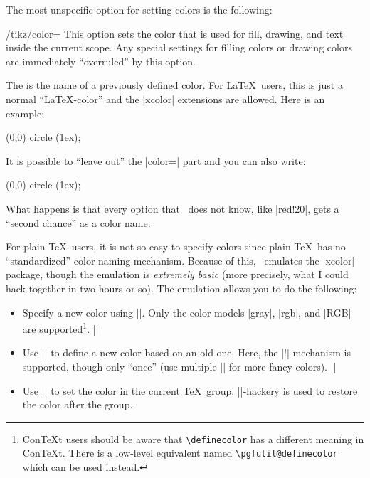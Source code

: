 The most unspecific option for setting colors is the following:
%
\begin{key}{/tikz/color=}
    This option sets the color that is used for fill, drawing, and text inside
    the current scope. Any special settings for filling colors or drawing
    colors are immediately ``overruled'' by this option.

    The  is the name of a previously defined color. For
    \LaTeX\ users, this is just a normal ``\LaTeX-color'' and the |xcolor|
    extensions are allowed. Here is an example:
\begin{codeexample}[]
\tikz \fill[color=red!20] (0,0) circle (1ex);
\end{codeexample}

    It is possible to ``leave out'' the |color=| part and you can also write:
\begin{codeexample}[]
\tikz \fill[red!20] (0,0) circle (1ex);
\end{codeexample}
    What happens is that every option that \tikzname\ does not know, like
    |red!20|, gets a ``second chance'' as a color name.

    For plain \TeX\ users, it is not so easy to specify colors since plain
    \TeX\ has no ``standardized'' color naming mechanism. Because of this,
    \pgfname\ emulates the |xcolor| package, though the emulation is
    \emph{extremely basic} (more precisely, what I could hack together in two
    hours or so). The emulation allows you to do the following:
    \begin{itemize}
        \item Specify a new color using |\definecolor|. Only the color models
            |gray|, |rgb|, and |RGB| are supported\footnote{Con\TeX t users
            should be aware that \texttt{\textbackslash definecolor} has a
            different meaning in Con\TeX t. There is a low-level equivalent
            named \texttt{\textbackslash pgfutil@definecolor} which can be
            used instead.}.
            \example ||
        \item Use || to define a new color based on an old one.
            Here, the |!| mechanism is supported, though only ``once'' (use
            multiple || for more fancy colors).
            \example ||
        \item Use |\color| to set the color in the current
            \TeX\ group. |\aftergroup|-hackery is used to restore the color
            after the group.
    \end{itemize}
\end{key}

